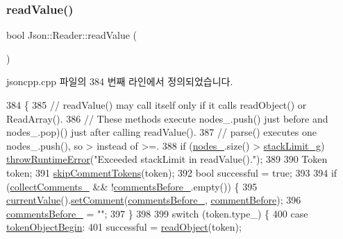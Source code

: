 \subsubsection{\texorpdfstring{read\+Value()}{readValue()}}
{\footnotesize\ttfamily bool Json\+::\+Reader\+::read\+Value (\begin{DoxyParamCaption}{ }\end{DoxyParamCaption})\hspace{0.3cm}{\ttfamily [private]}}



jsoncpp.\+cpp 파일의 384 번째 라인에서 정의되었습니다.


\begin{DoxyCode}
384                        \{
385   \textcolor{comment}{// readValue() may call itself only if it calls readObject() or ReadArray().}
386   \textcolor{comment}{// These methods execute nodes\_.push() just before and nodes\_.pop)() just after calling readValue(). }
387   \textcolor{comment}{// parse() executes one nodes\_.push(), so > instead of >=.}
388   \textcolor{keywordflow}{if} (\hyperlink{class_json_1_1_reader_ada3d2c47699dad662e6d156c8c78a6ac}{nodes\_}.size() > \hyperlink{jsoncpp_8cpp_a924838165f45fcacf57b5cd03062b478}{stackLimit\_g}) \hyperlink{namespace_json_a0ab7ff7f99788262d92d9ff3d924e065}{throwRuntimeError}(\textcolor{stringliteral}{"Exceeded
       stackLimit in readValue()."});
389 
390   Token token;
391   \hyperlink{class_json_1_1_reader_a22e677ef400d8223f27e631b4cd4b821}{skipCommentTokens}(token);
392   \textcolor{keywordtype}{bool} successful = \textcolor{keyword}{true};
393 
394   \textcolor{keywordflow}{if} (\hyperlink{class_json_1_1_reader_a8e9ce743f6004f0596692f0a9ee4626c}{collectComments\_} && !\hyperlink{class_json_1_1_reader_af777967adaf0b2e882efa07673754381}{commentsBefore\_}.empty()) \{
395     \hyperlink{class_json_1_1_reader_a85597f763fb0148a17359b6dfc6f7326}{currentValue}().\hyperlink{class_json_1_1_value_a29f3a30f7e5d3af6f38d57999bf5b480}{setComment}(\hyperlink{class_json_1_1_reader_af777967adaf0b2e882efa07673754381}{commentsBefore\_}, 
      \hyperlink{namespace_json_a4fc417c23905b2ae9e2c47d197a45351a52f1733775460517b2ea6bedf4906d52}{commentBefore});
396     \hyperlink{class_json_1_1_reader_af777967adaf0b2e882efa07673754381}{commentsBefore\_} = \textcolor{stringliteral}{""};
397   \}
398 
399   \textcolor{keywordflow}{switch} (token.type\_) \{
400   \textcolor{keywordflow}{case} \hyperlink{class_json_1_1_reader_aa35e6ab574dc399a0a645ad98ed66bc9a6196ce743696e6c803b130e8eef970f3}{tokenObjectBegin}:
401     successful = \hyperlink{class_json_1_1_reader_a0068eb3d8e86e91f0e4806f60da66b9c}{readObject}(token);

\end{DoxyCode}
